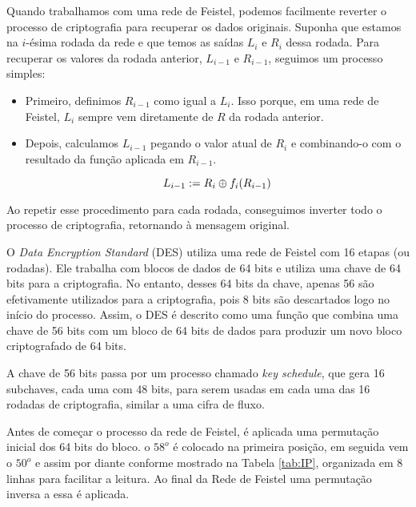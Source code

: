 Quando trabalhamos com uma rede de Feistel, podemos facilmente reverter o processo de criptografia para recuperar os dados originais.
Suponha que estamos na $i$-ésima rodada da rede e que temos as saídas $L_i$ e $R_i$ dessa rodada.
Para recuperar os valores da rodada anterior, $L_{i-1}$ e $R_{i-1}$, seguimos um processo simples:

\begin{itemize}
\item Primeiro, definimos $R_{i-1}$ como igual a $L_i$.
  Isso porque, em uma rede de Feistel, $L_i$ sempre vem diretamente de $R$ da rodada anterior.
\item Depois, calculamos $L_{i-1}$ pegando o valor atual de $R_i$ e combinando-o com o resultado da função aplicada em $R_{i-1}$.

  \begin{displaymath}
    L_{i-1} := R_i \oplus f_i(R_{i-1})
  \end{displaymath}
\end{itemize}

Ao repetir esse procedimento para cada rodada, conseguimos inverter todo o processo de criptografia, retornando à mensagem original.

O \textit{Data Encryption Standard} (DES) utiliza uma rede de Feistel com 16 etapas (ou rodadas).
Ele trabalha com blocos de dados de 64 bits e utiliza uma chave de 64 bits para a criptografia.
No entanto, desses 64 bits da chave, apenas 56 são efetivamente utilizados para a criptografia, pois 8 bits são descartados logo no início do processo.
Assim, o DES é descrito como uma função que combina uma chave de 56 bits com um bloco de 64 bits de dados para produzir um novo bloco criptografado de 64 bits.

A chave de 56 bits passa por um processo chamado \textit{key schedule}, que gera 16 subchaves, cada uma com 48 bits, para serem usadas em cada uma das 16 rodadas de criptografia, similar a uma cifra de fluxo.

Antes de começar o processo da rede de Feistel, é aplicada uma permutação inicial dos 64 bits do bloco.
o $58^o$ é colocado na primeira posição, em seguida vem o $50^o$ e assim por diante conforme mostrado na Tabela \ref{tab:IP}, organizada em 8 linhas para facilitar a leitura.
Ao final da Rede de Feistel uma permutação inversa a essa é aplicada.

